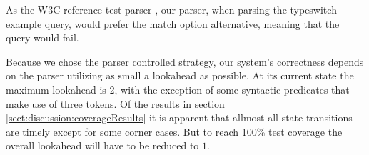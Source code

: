 As the W3C reference test parser \cite{parserTestPage}, our parser, when parsing the typeswitch example query, would prefer the match option alternative, meaning that the query would fail.

Because we chose the parser controlled strategy, our system's correctness depends on the parser utilizing as small a lookahead as possible. At its current state the maximum lookahead is $2$, with the exception of some syntactic predicates that make use of three tokens. Of the results in section \ref{sect:discussion:coverageResults} it is apparent that allmost all state transitions are timely except for some corner cases. But to reach 100\% test coverage the overall lookahead will have to be reduced to $1$. 
